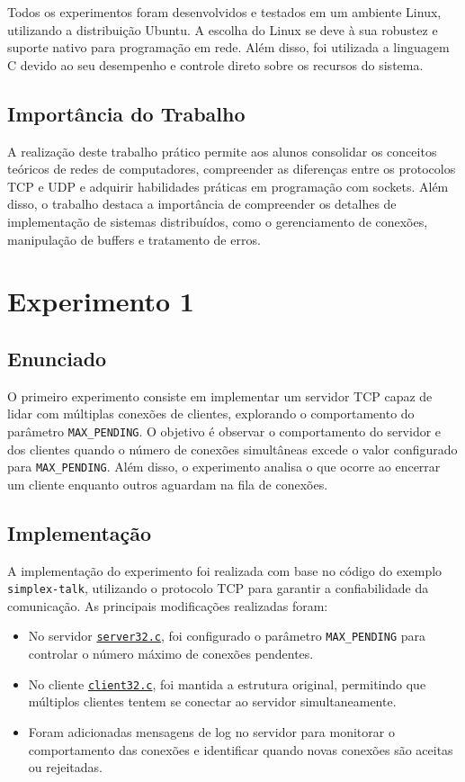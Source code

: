 \documentclass{article}
\begin{document}
Todos os experimentos foram desenvolvidos e testados em um ambiente Linux, utilizando a distribuição Ubuntu. A escolha do Linux se deve à sua robustez e suporte nativo para programação em rede. Além disso, foi utilizada a linguagem C devido ao seu desempenho e controle direto sobre os recursos do sistema.

\subsection{Importância do Trabalho}

A realização deste trabalho prático permite aos alunos consolidar os conceitos teóricos de redes de computadores, compreender as diferenças entre os protocolos TCP e UDP e adquirir habilidades práticas em programação com sockets. Além disso, o trabalho destaca a importância de compreender os detalhes de implementação de sistemas distribuídos, como o gerenciamento de conexões, manipulação de buffers e tratamento de erros.

\section{Experimento 1}

\subsection{Enunciado}

O primeiro experimento consiste em implementar um servidor TCP capaz de lidar com múltiplas conexões de clientes, explorando o comportamento do parâmetro \texttt{MAX\_PENDING}. O objetivo é observar o comportamento do servidor e dos clientes quando o número de conexões simultâneas excede o valor configurado para \texttt{MAX\_PENDING}. Além disso, o experimento analisa o que ocorre ao encerrar um cliente enquanto outros aguardam na fila de conexões.

\subsection{Implementação}

A implementação do experimento foi realizada com base no código do exemplo \texttt{simplex-talk}, utilizando o protocolo TCP para garantir a confiabilidade da comunicação. As principais modificações realizadas foram:

\begin{itemize}
    \item No servidor \hyperref[lst:server1]{\texttt{server32.c}}, foi configurado o parâmetro \texttt{MAX\_PENDING} para controlar o número máximo de conexões pendentes.
    \item No cliente \hyperref[lst:client1]{\texttt{client32.c}}, foi mantida a estrutura original, permitindo que múltiplos clientes tentem se conectar ao servidor simultaneamente.
    \item Foram adicionadas mensagens de log no servidor para monitorar o comportamento das conexões e identificar quando novas conexões são aceitas ou rejeitadas.\end{itemize}
\end{document}
